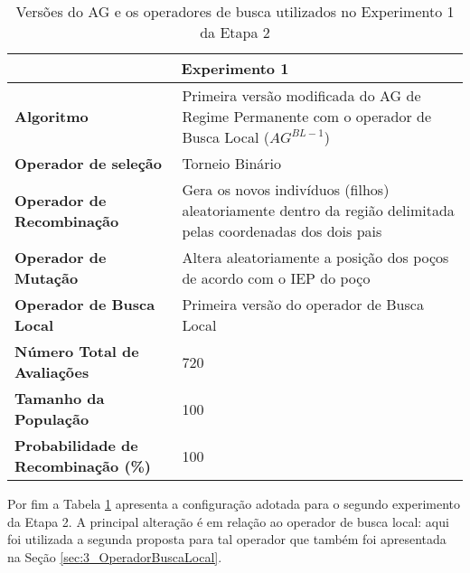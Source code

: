 \begin{table}[!htbp]
\centering
\caption{Versões do AG e os operadores de busca utilizados no Experimento 1 da Etapa 2}
\label{table:con06}
\begin{tabular}{|p{6cm}|p{9cm}|}
\hline

\multicolumn{2}{|c|}{\textbf{Experimento 1}} \\ \hline
\textbf{Algoritmo} & Primeira versão modificada do AG de Regime Permanente com o operador de Busca Local ($AG^{BL-1}$) \\ \hline
\textbf{Operador de seleção} & Torneio Binário \\ \hline
\textbf{Operador de Recombinação} & Gera os novos indivíduos (filhos) aleatoriamente dentro da região delimitada pelas coordenadas dos dois pais \\  \hline
\textbf{Operador de Mutação} & Altera aleatoriamente a posição dos poços de acordo com o IEP do poço \\ \hline
\textbf{Operador de Busca Local} & Primeira versão do operador de Busca Local \\ \hline
\textbf{Número Total de Avaliações} & 720 \\ \hline
\textbf{Tamanho da População} & 100 \\ \hline
\textbf{Probabilidade de Recombinação (\%)} & 100 \\ \hline
\end{tabular}
\end{table}

Por fim a Tabela \ref{table:con06} apresenta a configuração adotada para o segundo experimento da Etapa 2. A principal alteração é em relação ao operador de busca local: aqui foi utilizada a segunda proposta para tal operador que também foi apresentada na Seção \ref{sec:3_OperadorBuscaLocal}.

